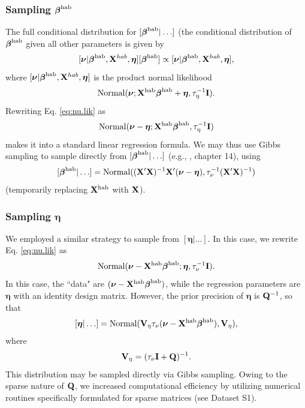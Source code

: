 \documentclass[10pt]{article}
\begin{document}
\subsubsection*{Sampling $\boldsymbol{\beta}^{\rm hab}$}

The full conditional distribution for $[\boldsymbol{\beta}^{\rm hab}|\hdots]$ (the conditional distribution of $\boldsymbol{\beta}^{\rm hab}$ given all other parameters is given by
$$
    [\boldsymbol{\nu} | \boldsymbol{\beta}^{\rm hab},{\bf X}^{hab},\boldsymbol{\eta}][\boldsymbol{\beta}^{\rm hab}]\propto[\boldsymbol{\nu} | \boldsymbol{\beta}^{\rm hab},{\bf X}^{hab},\boldsymbol{\eta}],
$$
where $ [\boldsymbol{\nu} | \boldsymbol{\beta}^{\rm hab},{\bf X}^{hab},\boldsymbol{\eta}]$
is the product normal likelihood
\begin{equation} \label{eq:nu.lik}
{\rm Normal}(\boldsymbol{\nu};{\bf X}^{\rm hab} \boldsymbol{\beta}^{\rm hab} +\boldsymbol{\eta},\tau_\eta^{-1}{\bf I}).
\end{equation}
Rewriting Eq. \ref{eq:nu.lik} as
$$
{\rm Normal}(\boldsymbol{\nu}-\boldsymbol{\eta};{\bf X}^{\rm hab}\boldsymbol{\beta}^{\rm hab} ,\tau_\eta^{-1}{\bf I})
$$
makes it into a standard linear regression formula. We may
thus use Gibbs sampling to sample directly from $[\boldsymbol{\beta}^{\rm hab}|\hdots]$ (e.g., \cite{GelmanEtAl2004}, chapter 14), using
\begin{equation}
\label{eq:beta.post}
[\boldsymbol{\beta}^{\rm hab}|\hdots]={\rm Normal}(({\bf X}^\prime {\bf X})^{-1}{\bf X}^\prime (\boldsymbol{\nu}-\boldsymbol{\eta}),\tau_\nu^{-1}({\bf X}^\prime {\bf X})^{-1})
\end{equation}
(temporarily replacing ${\bf X}^{\rm hab}$ with ${\bf X}$).

\subsubsection*{Sampling $\boldsymbol{\eta}$}

We employed a similar strategy to sample from  $[\boldsymbol{\eta}|\hdots]$.  In this case, we
rewrite Eq. \ref{eq:nu.lik} as
$$
{\rm Normal}(\boldsymbol{\nu}-{\bf X}^{\rm hab}\boldsymbol{\beta}^{\rm hab};\boldsymbol{\eta} ,\tau_\nu^{-1}{\bf I}).
$$
In this case, the ``data" are $(\boldsymbol{\nu}-{\bf X}^{\rm hab}\boldsymbol{\beta}^{\rm hab})$, while the regression parameters are $\boldsymbol{\eta}$ with an identity design matrix. However, the prior precision of $\boldsymbol{\eta}$ is ${\bf Q}^{-1}$, so that
$$
[\boldsymbol{\eta}|\hdots] = {\rm Normal}({\bf V}_\eta \tau_\nu (\boldsymbol{\nu}-{\bf X}^{\rm hab}\boldsymbol{\beta}^{\rm hab}),{\bf V}_\eta),
$$
where
$$
{\bf V}_\eta=(\tau_\nu{\bf I} + {\bf Q})^{-1}.
$$
This distribution may be sampled directly via Gibbs sampling. Owing to the sparse nature of ${\bf Q}$, we increased computational efficiency by utilizing numerical routines specifically formulated for sparse matrices (see Dataset S1).
\end{document}
